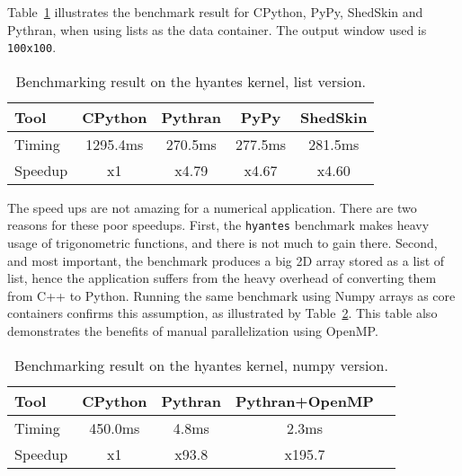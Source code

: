 \documentclass[10pt, onecolumn, preprint]{sigplanconf}
\begin{document}
Table~\ref{tbl:hyantes} illustrates the benchmark result for CPython, PyPy,
ShedSkin and Pythran, when using lists as the data container. The output window
used is \texttt{100x100}.

\begin{table}
    \centering

    \begin{tabular}{|l|c|c|c|c|}

        \hline
     Tool    &  CPython    &   Pythran     &     PyPy   &  ShedSkin  \\
    \hline
     Timing  &  1295.4ms   &   270.5ms     &    277.5ms &  281.5ms   \\
    \hline
     Speedup &  x1         &    x4.79      &    x4.67   &  x4.60     \\
    \hline
\end{tabular}
\caption{Benchmarking result on the hyantes kernel, list version.}
\label{tbl:hyantes}

\end{table}

The speed ups are not amazing %
for a numerical application. There are two
reasons for these poor speedups. First, the \texttt{hyantes} benchmark makes heavy
usage of trigonometric functions, and there is not much to gain there. Second, and
most important, the benchmark produces a big 2D array stored as a list of list,
hence the application suffers from the heavy overhead of converting them from C++
to Python. Running the same benchmark using Numpy arrays as core containers
confirms this assumption, as illustrated by Table~\ref{tbl:np-hyantes}. This
table also demonstrates the benefits of manual parallelization using OpenMP.


\begin{table}
    \centering

    \begin{tabular}{|l|c|c|c|c|}

        \hline
     Tool    &  CPython    &   Pythran     & Pythran+OpenMP   \\
    \hline
     Timing  &  450.0ms    &   4.8ms       &      2.3ms       \\
    \hline
     Speedup &  x1         &    x93.8      &    x195.7        \\
    \hline
\end{tabular}
\caption{Benchmarking result on the hyantes kernel, numpy version.}
\label{tbl:np-hyantes}
\end{table}
\end{document}
